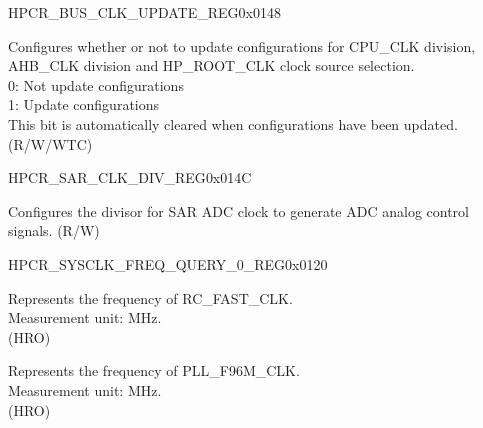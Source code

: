 \begin{register}{H}{PCR\_BUS\_CLK\_UPDATE\_REG}{0x0148}\label{regdesc:PCRBUSCLKUPDATEREG}
%
%
\regnewline%
\begin{regdesc}\begin{reglist}
\label{fielddesc:PCRBUSCLOCKUPDATE}\item [PCR\_BUS\_CLOCK\_UPDATE] Configures whether or not to update configurations for CPU\_CLK division, AHB\_CLK division and HP\_ROOT\_CLK clock source selection.\\
0: Not update configurations\\
1: Update configurations\\
This bit is automatically cleared when configurations have been updated.
(R/W/WTC)
\end{reglist}\end{regdesc}
\end{register}

\begin{register}{H}{PCR\_SAR\_CLK\_DIV\_REG}{0x014C}\label{regdesc:PCRSARCLKDIVREG}
%
%
\regnewline%
\begin{regdesc}\begin{reglist}
\label{fielddesc:PCRSAR1CLKDIVNUM}\item [PCR\_SAR1\_CLK\_DIV\_NUM] Configures the divisor for SAR ADC clock to generate ADC analog control signals. (R/W)
\end{reglist}\end{regdesc}
\end{register}





\begin{register}{H}{PCR\_SYSCLK\_FREQ\_QUERY\_0\_REG}{0x0120}\label{regdesc:PCRSYSCLKFREQQUERY0REG}
%
%
%
\regnewline%
\begin{regdesc}\begin{reglist}
\label{fielddesc:PCRFOSCFREQ}\item [PCR\_FOSC\_FREQ] Represents the frequency of RC\_FAST\_CLK.\\
Measurement unit: MHz.\\ (HRO)
\label{fielddesc:PCRPLLFREQ}\item [PCR\_PLL\_FREQ] Represents the frequency of PLL\_F96M\_CLK.\\
Measurement unit: MHz.\\
(HRO)
\end{reglist}\end{regdesc}
\end{register}


